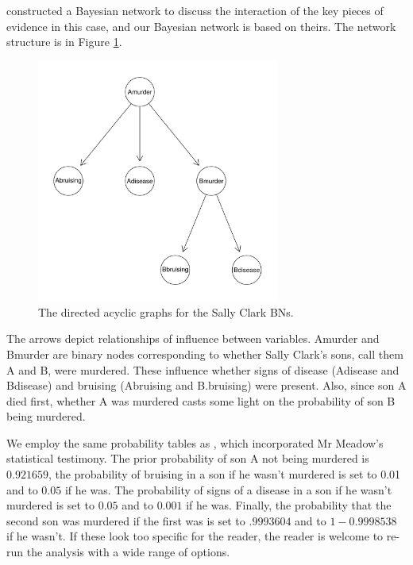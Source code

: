 \documentclass[10pt,]{scrartcl}
\begin{document}












\citet{Fenton2018Risk} constructed a Bayesian network to discuss the interaction of the key pieces of evidence in this case, and our Bayesian network is based on theirs.  The network structure is in Figure \ref{fig:sc}.


\begin{figure}[H]
\centering 
    \includegraphics[width = 8cm]{../images/scFullDAG.png}
    \caption{The directed acyclic graphs for the Sally Clark BNs. }
    \label{fig:sc}
\end{figure}



The  arrows  depict  relationships  of  influence  between  variables. \textsf{Amurder} and \textsf{Bmurder} are binary nodes corresponding to whether Sally  Clark’s  sons,   call  them A and B, were murdered. These  influence  whether  signs of disease (\textsf{Adisease} and \textsf{Bdisease}) and bruising (\textsf{Abruising} and \textsf{B.bruising}) were present. Also, since  son A died first, whether A was murdered casts some light on the probability of son B being murdered.

We employ the same probability tables as \citet{Fenton2018Risk}, which incorporated Mr Meadow's statistical testimony. The prior probability of son A not being murdered is $0.921659$, the probability of bruising in a son if he wasn't murdered is set to 0.01 and to $0.05$ if he was. The probability of signs of a disease in a son if he wasn't murdered is set to $0.05$ and to $0.001$ if he was. Finally, the probability that the second son was murdered if the first was is set to $.9993604$ and to $1-0.9998538$ if he wasn't. If these look too specific for the reader, the reader is welcome to re-run the analysis with a wide range of options. 
\end{document}
